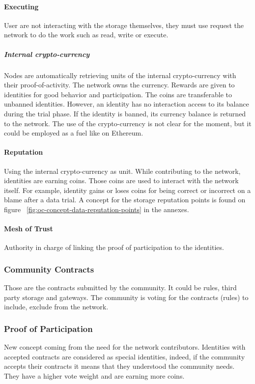 \paragraph{Executing} User are not interacting with the storage themselves, they must use request the network to do the work such as read, write or execute.

\subparagraph{Internal crypto-currency} Nodes are automatically retrieving units of the internal crypto-currency with their proof-of-activity. The network owns the currency. Rewards are given to identities for good behavior and participation. The coins are transferable to unbanned identities. However, an identity has no interaction access to its balance during the trial phase. If the identity is banned, its currency balance is returned to the network. The use of the crypto-currency is not clear for the moment, but it could be employed as a fuel like on Ethereum\cite{Ethereum2016EthereumDocumentation}.

\paragraph{Reputation} Using the internal crypto-currency as unit. While contributing to the network, identities are earning coins. Those coins are used to interact with the network itself. For example, identity gains or loses coins for being correct or incorrect on a blame after a data trial. A concept for the storage reputation points is found on figure ~\ref{fig:oc-concept-data-reputation-points} in the annexes.

\paragraph{Mesh of Trust} Authority in charge of linking the proof of participation to the identities. 

\subsubsection{Community Contracts} Those are the contracts submitted by the community. It could be rules, third party storage and gateways. The community is voting for the contracts (rules) to include, exclude from the network.

\subsubsection{Proof of Participation} New concept coming from the need for the network contributors. Identities with accepted contracts are considered as special identities, indeed, if the community accepts their contracts it means that they understood the community needs. They have a higher vote weight and are earning more coins.


